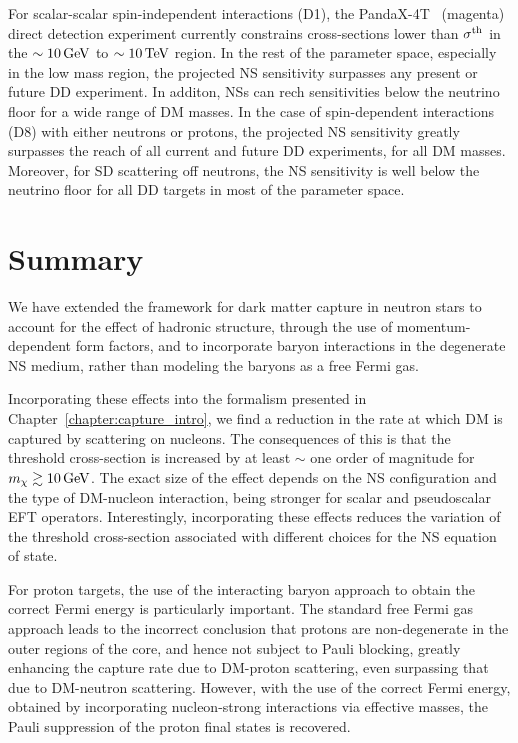 For scalar-scalar spin-independent interactions (D1), the %
PandaX-4T~\cite{PandaX-4T:2021bab_dec_DarkMatterSearch} 
(magenta) direct detection experiment currently constrains cross-sections lower than $\sigma^{\rm th}$ in the $\sim10{\rm \,GeV}$ to $\sim10{\rm \,TeV}$ region.  In the rest of the parameter space, especially in the low mass region, the projected NS sensitivity surpasses any present or future DD experiment. In additon, NSs can rech sensitivities below the neutrino floor for a wide range of DM masses. In the case of spin-dependent interactions (D8) with either neutrons or protons, the projected NS sensitivity greatly surpasses the reach of all current and future DD experiments, for all DM masses. Moreover, for SD scattering off neutrons, the NS sensitivity is well below the neutrino floor for all DD targets in most of the parameter space. 


\section{Summary}
\label{ch5:sec:summary}

We have extended the framework for dark matter capture in neutron stars to account for the effect of hadronic structure, through the use of momentum-dependent form factors, and to incorporate baryon interactions in the degenerate NS medium, rather than modeling the baryons as a free Fermi gas. 

Incorporating these effects into the formalism presented in Chapter~\ref{chapter:capture_intro}, we find a reduction in the rate at which DM is captured by scattering on nucleons.  The consequences of this is that the threshold cross-section is increased by at least $\sim$ one order of magnitude for $m_\chi\gtrsim10{\rm \,GeV}$. The exact size of the effect depends on the NS configuration and the type of DM-nucleon interaction, being stronger for scalar and pseudoscalar EFT operators. Interestingly, incorporating these effects reduces the variation of the threshold cross-section associated with different choices for the NS equation of state.

For proton targets, the use of the interacting baryon approach to obtain the correct Fermi energy is particularly important.  The standard free Fermi gas approach leads to the incorrect conclusion that protons are non-degenerate in the outer regions of the core, and hence not subject to Pauli blocking, greatly enhancing the capture rate due to DM-proton scattering, even surpassing that due to DM-neutron scattering.  However, with the use of the correct Fermi energy, obtained by incorporating nucleon-strong interactions via effective masses, the Pauli suppression of the proton final states is recovered. 

